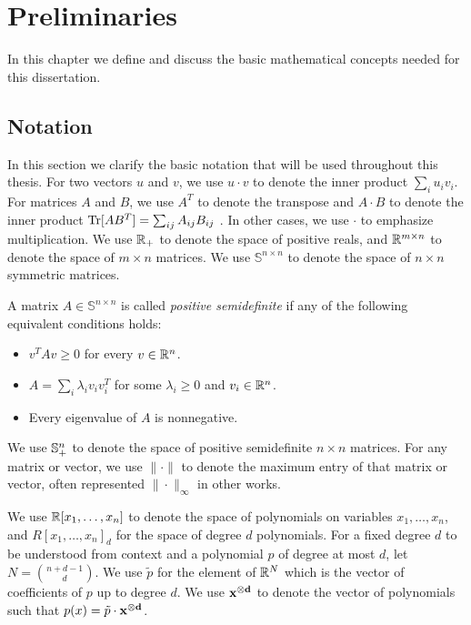 \chapter{Preliminaries}\label{cha:prelims}
In this chapter we define and discuss the basic mathematical concepts needed for this dissertation.

\section{Notation}
In this section we clarify the basic notation that will be used throughout this thesis. For two vectors $u$ and $v$, we use $u \cdot v$ to denote the inner product $\sum_i u_i v_i$. For matrices $A$ and $B$, we use $A^T$ to denote the transpose and $A \cdot B$ to denote the inner product $\operatorname{Tr}[AB^T] = \sum_{ij} A_{ij}B_{ij}$ .  In other cases, we use $\cdot$ to emphasize multiplication. We use $\mathbb R_+$ to denote the space of positive reals, and $\mathbb R^{m \times n}$ to denote the space of $m \times n$ matrices. We use $\mathbb{S}^{n \times n}$ to denote the space of $n \times n$ symmetric matrices.
\begin{definition}
A matrix $A \in \mathbb{S}^{n \times n}$ is called \emph{positive semidefinite} if any of the following equivalent conditions holds:
\begin{itemize}
\item $v^TAv \geq 0$ for every $v \in \mathbb R^n$.
\item $A = \sum_i \lambda_i v_iv_i^T$ for some $\lambda_i \geq 0$ and $v_i \in \mathbb R^n$.
\item Every eigenvalue of $A$ is nonnegative.
\end{itemize}
\end{definition}
We use $\mathbb{S}^{n}_+$ to denote the space of positive semidefinite $n \times n$ matrices. For any matrix or vector, we use $\|\cdot\|$ to denote the maximum entry of that matrix or vector, often represented $\|\cdot\|_\infty$ in other works.

We use $\mathbb R[x_1,\dots,x_n]$ to denote the space of polynomials on variables $x_1,\dots,x_n$, and $R[x_1,\dots,x_n]_d$ for the space of degree $d$ polynomials.
For a fixed degree  $d$ to be understood from context and a polynomial $p$ of degree at most $d$, let $N = \binom{n+d-1}{d}$. We use $\tilde{p}$ for the element of $\mathbb R^{N}$ which is the vector of coefficients of $p$ up to degree $d$. We use $\mathbf{x^{\otimes d}}$ to denote the vector of polynomials such that $p(x) = \tilde{p} \cdot \mathbf{x^{\otimes d}}$.

